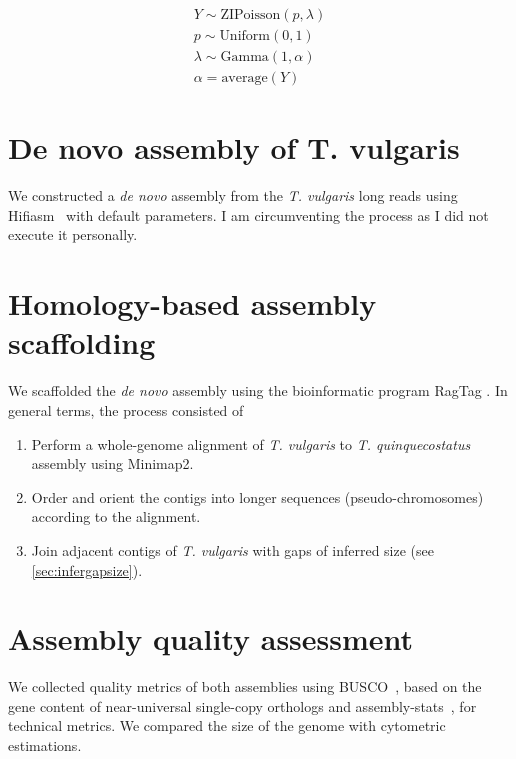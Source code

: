 \begin{subequations}
\label{eq:model}
\begin{align}
Y \sim \textrm{ZIPoisson}(p, \lambda) \label{eq:model1}\\
p \sim \textrm{Uniform}(0, 1) \label{eq:model2}\\
\lambda \sim \textrm{Gamma}(1, \alpha)  \label{eq:model3}\\
\alpha = \textrm{average}(Y) \label{eq:model4}
\end{align}   
\end{subequations}


\section{De novo assembly of T. vulgaris}\label{sec:denovo}

We constructed a \textit{de novo} assembly from the \textit{T. vulgaris} long reads using Hifiasm~\cite{chengHaplotyperesolvedNovoAssembly2021} with default parameters. I am circumventing the process as I did not execute it personally.
        
\section{Homology-based assembly scaffolding}\label{sec:scaffold}

We scaffolded the \textit{de novo} assembly using the bioinformatic program RagTag \cite{alongeAutomatedAssemblyScaffolding2022}. In general terms, the process consisted of 
\begin{enumerate}
    \item Perform a whole-genome alignment of \textit{T. vulgaris} to \textit{T. quinquecostatus} assembly using Minimap2. 
    \item Order and orient the contigs into longer sequences (pseudo-chromosomes) according to the alignment. 
    \item Join adjacent contigs of \textit{T. vulgaris} with gaps of inferred size (see \autoref{sec:infergapsize}). 
\end{enumerate}

\section{Assembly quality assessment}

We collected quality metrics of both assemblies using \ac{BUSCO}~\cite{manniBUSCOAssessingGenomic2021}, based on the gene content of near-universal single-copy orthologs and assembly-stats~\cite{Assemblystats2023}, for technical metrics. We compared the size of the genome with cytometric estimations\cite{PlantDNACvalues}. 

